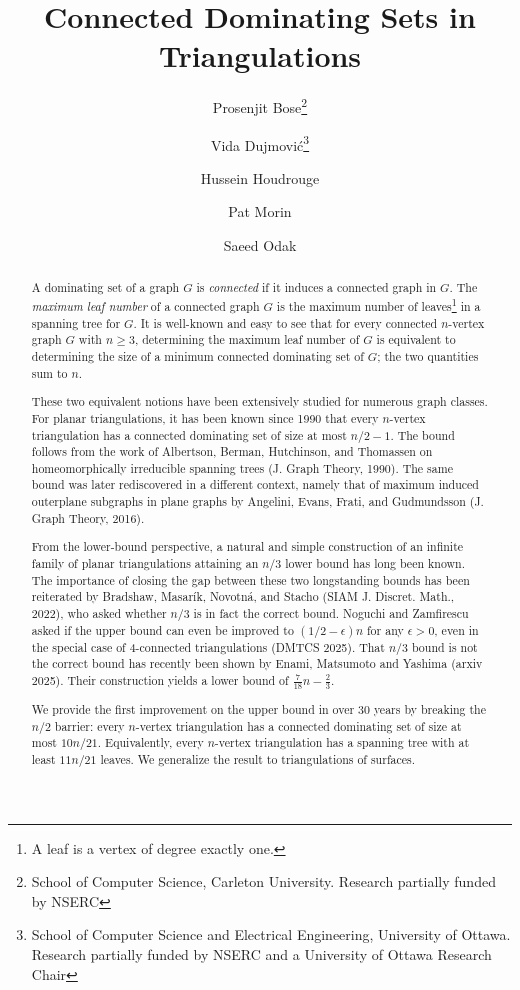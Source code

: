 \documentclass[11pt]{article}
\title{Connected Dominating Sets in Triangulations}
\author{%
  Prosenjit Bose\thanks{School of Computer Science, Carleton University. Research partially funded by NSERC} \and
  Vida Dujmović\thanks{School of Computer Science and Electrical Engineering, University of Ottawa. Research partially funded by NSERC and a University of Ottawa Research Chair}\and
  Hussein Houdrouge\footnotemark[1] \and
  Pat Morin\footnotemark[1] \and
  Saeed Odak\footnotemark[2]}
\date{}
\theoremstyle{definition}
\begin{document}
\begin{titlepage}
\maketitle

\begin{abstract}
A dominating set of a graph $G$ is \emph{connected} if it induces a connected graph in $G$. The \emph{maximum leaf number} of a connected graph $G$ is the maximum number of leaves\footnote{A leaf is a vertex of degree exactly one.} in a spanning tree for $G$. It is
well-known and easy to see that for every connected $n$-vertex graph $G$ with $n\geq 3$, determining the maximum leaf number of $G$ is equivalent to determining the size of a minimum connected dominating set of $G$; the two quantities sum to $n$.

These two equivalent notions have been extensively studied for numerous graph classes. For planar triangulations, it has been known since 1990 that every $n$-vertex triangulation has a connected dominating set of size at most $n/2- 1$. The bound follows from the work of Albertson, Berman, Hutchinson, and Thomassen on homeomorphically irreducible spanning trees (J. Graph Theory, 1990). The same bound was later rediscovered in a different context, namely that of maximum induced outerplane subgraphs in plane graphs by Angelini, Evans, Frati, and Gudmundsson (J. Graph Theory, 2016). 

From the lower-bound perspective, a natural and simple construction of an infinite family of planar triangulations attaining an $n/3$ lower bound has long been known. The importance of closing the gap between these two longstanding bounds has been reiterated by Bradshaw,  Masar\'ik, Novotn\'a, and Stacho (SIAM J. Discret. Math., 2022), who asked whether $n/3$ is in fact the correct bound. Noguchi and Zamfirescu asked if the upper bound can even be improved to $(1/2 - \epsilon)n$ for any $\epsilon > 0$, even in the special case of 4-connected triangulations (DMTCS 2025). That $n/3$ bound is not the correct bound has recently been shown by Enami, Matsumoto and Yashima (arxiv 2025). Their construction yields a lower bound of $\frac{7}{18}n - \frac{2}{3}$.

We provide the first improvement on the upper bound in over 30 years  by breaking the $n/2$ barrier: every $n$-vertex triangulation has a connected dominating set of size at most $10n/21$.  Equivalently, every $n$-vertex triangulation has a spanning tree with at least $11n/21$ leaves. We generalize the result to triangulations of surfaces. 
\newpage




\end{abstract}
\end{titlepage}
\end{document}
